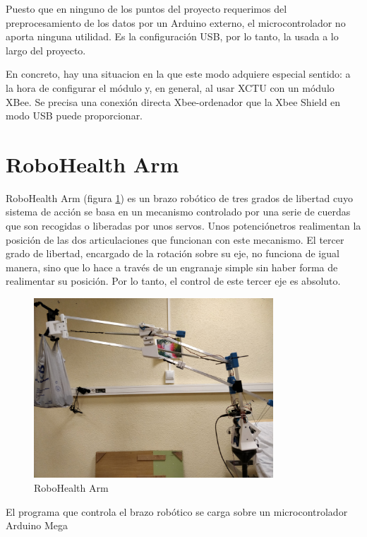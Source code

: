 Puesto que en ninguno de los puntos del proyecto requerimos del preprocesamiento de los datos por un Arduino externo, el microcontrolador no aporta ninguna utilidad. Es la configuración USB, por lo tanto, la usada a lo largo del proyecto.

En concreto, hay una situacion en la que este modo adquiere especial sentido: a la hora de configurar el módulo y, en general, al usar XCTU con un módulo XBee. Se precisa una conexión directa Xbee-ordenador que la Xbee Shield en modo USB puede proporcionar.


\section{RoboHealth Arm}

RoboHealth Arm\cite{Heredia1:2018} (figura \ref{fig:RHA}) es un brazo robótico de tres grados de libertad cuyo sistema de acción se basa en un mecanismo controlado por una serie de cuerdas que son recogidas o liberadas por unos servos. Unos potenciónetros realimentan la posición de las dos articulaciones que funcionan con este mecanismo. El tercer grado de libertad, encargado de la rotación sobre su eje, no funciona de igual manera, sino que lo hace a través de un engranaje simple sin haber forma de realimentar su posición. Por lo tanto, el control de este tercer eje es absoluto.

\begin{figure}[bt]
\centering
\includegraphics[width=0.8\textwidth]{figuras/RHA.png}
\caption{RoboHealth Arm}
\label{fig:RHA}
\end{figure}

El programa que controla el brazo robótico\cite{Heredia2:2018} se carga sobre un microcontrolador Arduino Mega

